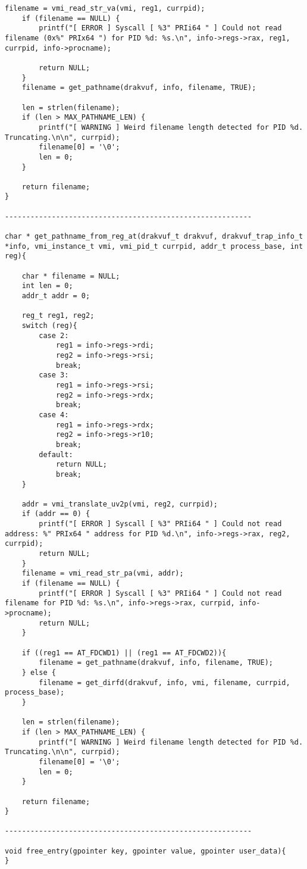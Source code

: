 {\begin{lstlisting}[style=CStyle]
	filename = vmi_read_str_va(vmi, reg1, currpid);
	if (filename == NULL) {
		printf("[ ERROR ] Syscall [ %3" PRIi64 " ] Could not read filename (0x%" PRIx64 ") for PID %d: %s.\n", info->regs->rax, reg1, currpid, info->procname);

		return NULL;
	}
	filename = get_pathname(drakvuf, info, filename, TRUE);
	
	len = strlen(filename);
	if (len > MAX_PATHNAME_LEN) {
		printf("[ WARNING ] Weird filename length detected for PID %d. Truncating.\n\n", currpid);
		filename[0] = '\0';
		len = 0;
	}
		
	return filename;
}

----------------------------------------------------------

char * get_pathname_from_reg_at(drakvuf_t drakvuf, drakvuf_trap_info_t *info, vmi_instance_t vmi, vmi_pid_t currpid, addr_t process_base, int reg){

	char * filename = NULL;
	int len = 0;
	addr_t addr = 0;
	
	reg_t reg1, reg2;
	switch (reg){
		case 2:
			reg1 = info->regs->rdi;
			reg2 = info->regs->rsi;
			break;
		case 3:
			reg1 = info->regs->rsi;
			reg2 = info->regs->rdx;
			break;
		case 4:
			reg1 = info->regs->rdx;
			reg2 = info->regs->r10;
			break;
		default:
			return NULL;
			break;
	}
		
	addr = vmi_translate_uv2p(vmi, reg2, currpid);
	if (addr == 0) {
		printf("[ ERROR ] Syscall [ %3" PRIi64 " ] Could not read address: %" PRIx64 " address for PID %d.\n", info->regs->rax, reg2, currpid);
		return NULL;
	}
	filename = vmi_read_str_pa(vmi, addr);
	if (filename == NULL) {
		printf("[ ERROR ] Syscall [ %3" PRIi64 " ] Could not read filename for PID %d: %s.\n", info->regs->rax, currpid, info->procname);
		return NULL;
	}
	
	if ((reg1 == AT_FDCWD1) || (reg1 == AT_FDCWD2)){
		filename = get_pathname(drakvuf, info, filename, TRUE);
	} else {
		filename = get_dirfd(drakvuf, info, vmi, filename, currpid, process_base);	
	}
	
	len = strlen(filename);
	if (len > MAX_PATHNAME_LEN) {
		printf("[ WARNING ] Weird filename length detected for PID %d. Truncating.\n\n", currpid);
		filename[0] = '\0';
		len = 0;
	}
	
	return filename;
}

----------------------------------------------------------

void free_entry(gpointer key, gpointer value, gpointer user_data){
}

\end{lstlisting}}	

